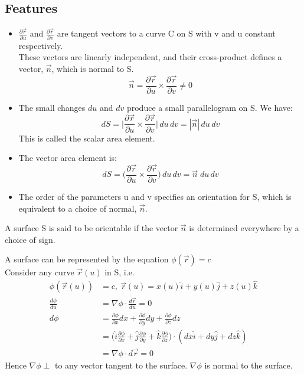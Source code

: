 \documentclass[a4paper, 11pt, normalem]{report}
\newcommand\p{\partial}
\newcommand\veru{\vec{r}(u)}
\begin{document}
\subsection{Features}
\begin{itemize}
    \item $\frac{\p \vec{r}}{\p u}$ and $\frac{\p \vec{r}}{\p v}$ are tangent vectors to a curve C on S with v and u constant respectively. \\
    These vectors are linearly independent, and their cross-product defines a vector, $\vec{n}$, which is normal to S.
            \begin{equation*}
                \vec{n} = \frac{\p \vec{r}}{\p u} \times \frac{\p \vec{r}}{\p v} \neq 0
            \end{equation*}
    \item The small changes $du$ and $dv$ produce a small parallelogram on S. We have:
            \begin{equation*}
                dS = \Bigg|\frac{\p \vec{r}}{\p u} \times \frac{\p \vec{r}}{\p v}\Bigg|\,du\,dv = |\vec{n}|\,du\,dv
            \end{equation*}
            This is called the scalar area element.
    \item The vector area element is:
            \begin{equation*}
                dS = \Bigg(\frac{\p \vec{r}}{\p u} \times \frac{\p \vec{r}}{\p v}\Bigg)\,du\,dv = \vec{n}\;du\,dv
            \end{equation*}
    \item The order of the parameters u and v specifies an orientation for S, which is equivalent to a choice of normal, $\vec{n}$.
\end{itemize}
A surface S is said to be orientable if the vector $\vec{n}$ is determined everywhere by a choice of sign.

A surface can be represented by the equation $\phi(\vec{r}) = c$ \\
Consider any curve $\veru$ in S, i.e.
\begin{align*}
    \phi(\veru) &= c, ~ \veru = x(u)\hat{i} + y(u)\hat{j} + z(u)\hat{k} \\
    \frac{d\phi}{du} &= \nabla\phi \cdot \frac{d\vec{r}}{du} = 0 \\
    d\phi &= \frac{\p \phi}{\p x}dx + \frac{\p\phi}{\p y}dy + \frac{\p\phi}{\p z}dz \\
    &= \Big(\hat{i}\frac{\p\phi}{\p x} + \hat{j}\frac{\p\phi}{\p y} + \hat{k}\frac{\p\phi}{\p z}\Big) \cdot (dx\hat{i} + dy\hat{j} + dz\hat{k}) \\
    &= \nabla\phi \cdot d\vec{r} = 0
\end{align*}
Hence $\nabla\phi \perp$ to any vector tangent to the surface. $\nabla\phi$ is normal to the surface.
\end{document}
